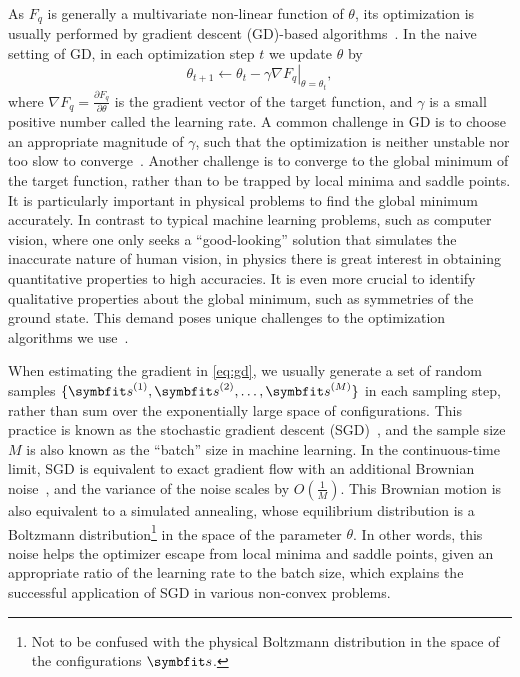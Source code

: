As $F_q$ is generally a multivariate non-linear function of $\theta$, its optimization is usually performed by gradient descent (GD)-based algorithms~\cite{curry1944method}. In the naive setting of GD, in each optimization step $t$ we update $\theta$ by
\begin{equation}
\theta_{t + 1} \gets \theta_t - \gamma \left. \nabla F_q \right|_{\theta = \theta_t},
\label{eq:gd}
\end{equation}
where $\nabla F_q = \frac{\partial F_q}{\partial \theta}$ is the gradient vector of the target function, and $\gamma$ is a small positive number called the learning rate. A common challenge in GD is to choose an appropriate magnitude of $\gamma$, such that the optimization is neither unstable nor too slow to converge~\cite{boyd2004convex}. Another challenge is to converge to the global minimum of the target function, rather than to be trapped by local minima and saddle points. It is particularly important in physical problems to find the global minimum accurately. In contrast to typical machine learning problems, such as computer vision, where one only seeks a ``good-looking'' solution that simulates the inaccurate nature of human vision, in physics there is great interest in obtaining quantitative properties to high accuracies. It is even more crucial to identify qualitative properties about the global minimum, such as symmetries of the ground state. This demand poses unique challenges to the optimization algorithms we use~\cite{chen2023efficient, michaud2023precision}.

When estimating the gradient in \cref{eq:gd}, we usually generate a set of random samples $\{\vs^{(1)}, \vs^{(2)}, \ldots, \vs^{(M)}\}$ in each sampling step, rather than sum over the exponentially large space of configurations. This practice is known as the stochastic gradient descent (SGD)~\cite{robbins1951stochastic, bottou1998online}, and the sample size $M$ is also known as the ``batch'' size in machine learning. In the continuous-time limit, SGD is equivalent to exact gradient flow with an additional Brownian noise~\cite{hu2017diffusion}, and the variance of the noise scales by $O\left( \frac{1}{M} \right)$. This Brownian motion is also equivalent to a simulated annealing, whose equilibrium distribution is a Boltzmann distribution\footnote{Not to be confused with the physical Boltzmann distribution in the space of the configurations $\vs$.} in the space of the parameter $\theta$. In other words, this noise helps the optimizer escape from local minima and saddle points, given an appropriate ratio of the learning rate to the batch size, which explains the successful application of SGD in various non-convex problems.

